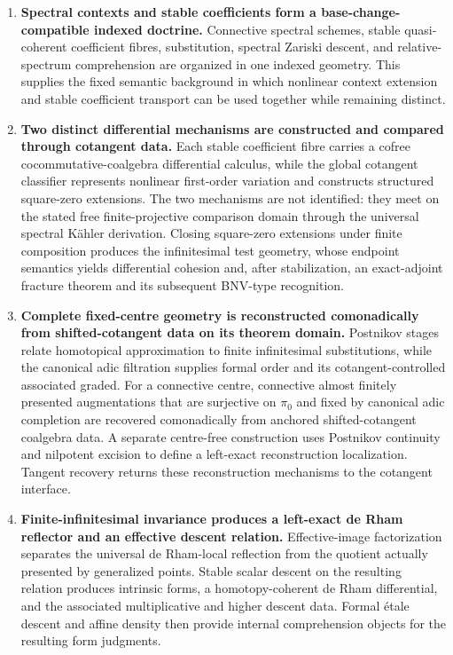 \begin{enumerate}

    \item
    \textbf{Spectral contexts and stable coefficients form a
    base-change-compatible indexed doctrine.}
    Connective spectral schemes, stable quasi-coherent coefficient fibres,
    substitution, spectral Zariski descent, and relative-spectrum
    comprehension are organized in one indexed geometry.  This supplies the
    fixed semantic background in which nonlinear context extension and stable
    coefficient transport can be used together while remaining distinct.

    \item
    \textbf{Two distinct differential mechanisms are constructed and compared
    through cotangent data.}
    Each stable coefficient fibre carries a cofree
    cocommutative-coalgebra differential calculus, while the global cotangent
    classifier represents nonlinear first-order variation and constructs
    structured square-zero extensions.  The two mechanisms are not
    identified: they meet on the stated free finite-projective comparison
    domain through the universal spectral K\"ahler derivation.  Closing
    square-zero extensions under finite composition produces the
    infinitesimal test geometry, whose endpoint semantics yields differential
    cohesion and, after stabilization, an exact-adjoint fracture theorem and
    its subsequent BNV-type recognition.

    \item
    \textbf{Complete fixed-centre geometry is reconstructed comonadically from
    shifted-cotangent data on its theorem domain.}
    Postnikov stages relate homotopical approximation to finite infinitesimal
    substitutions, while the canonical adic filtration supplies formal order
    and its cotangent-controlled associated graded.  For a connective centre,
    connective almost finitely presented augmentations that are surjective on
    \(\pi_0\) and fixed by canonical adic completion are recovered
    comonadically from anchored shifted-cotangent coalgebra data.  A separate
    centre-free construction uses Postnikov continuity and nilpotent excision
    to define a left-exact reconstruction localization.  Tangent recovery
    returns these reconstruction mechanisms to the cotangent interface.

    \item
    \textbf{Finite-infinitesimal invariance produces a left-exact de Rham
    reflector and an effective descent relation.}
    Effective-image factorization separates the universal de Rham-local
    reflection from the quotient actually presented by generalized points.
    Stable scalar descent on the resulting relation produces intrinsic forms,
    a homotopy-coherent de Rham differential, and the associated multiplicative
    and higher descent data.  Formal \'etale descent and affine density then
    provide internal comprehension objects for the resulting form judgments.


\end{enumerate}
